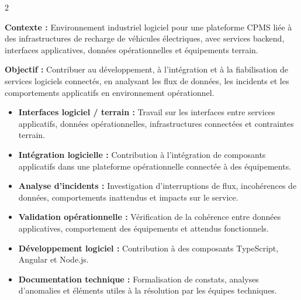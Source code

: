 \documentclass[8pt,a4paper,ragged2e,withhyper]{altacv}
\begin{document}



\makecvheader
\vspace{-0.3cm}


\begin{paracol}{2}



\textbf{Contexte :} Environnement industriel logiciel pour une plateforme CPMS liée à des infrastructures de recharge de véhicules électriques, avec services backend, interfaces applicatives, données opérationnelles et équipements terrain.

\textbf{Objectif :} Contribuer au développement, à l’intégration et à la fiabilisation de services logiciels connectés, en analysant les flux de données, les incidents et les comportements applicatifs en environnement opérationnel.

\begin{itemize}
  \item \textbf{Interfaces logiciel / terrain :} Travail sur les interfaces entre services applicatifs, données opérationnelles, infrastructures connectées et contraintes terrain.
  \item \textbf{Intégration logicielle :} Contribution à l’intégration de composants applicatifs dans une plateforme opérationnelle connectée à des équipements.
  \item \textbf{Analyse d’incidents :} Investigation d’interruptions de flux, incohérences de données, comportements inattendus et impacts sur le service.
  \item \textbf{Validation opérationnelle :} Vérification de la cohérence entre données applicatives, comportement des équipements et attendus fonctionnels.
  \item \textbf{Développement logiciel :} Contribution à des composants TypeScript, Angular et Node.js.
  \item \textbf{Documentation technique :} Formalisation de constats, analyses d’anomalies et éléments utiles à la résolution par les équipes techniques.
\end{itemize}


\end{paracol}
\end{document}
